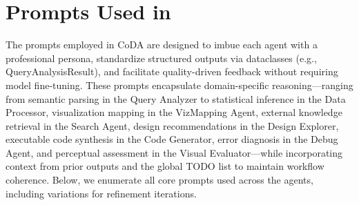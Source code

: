 \section{Prompts Used in \methodname{}}\label{appendix:prompts}

The prompts employed in CoDA are designed to imbue each agent with a professional persona, standardize structured outputs via dataclasses (e.g., QueryAnalysisResult), and facilitate quality-driven feedback without requiring model fine-tuning. These prompts encapsulate domain-specific reasoning—ranging from semantic parsing in the Query Analyzer to statistical inference in the Data Processor, visualization mapping in the VizMapping Agent, external knowledge retrieval in the Search Agent, design recommendations in the Design Explorer, executable code synthesis in the Code Generator, error diagnosis in the Debug Agent, and perceptual assessment in the Visual Evaluator—while incorporating context from prior outputs and the global TODO list to maintain workflow coherence. Below, we enumerate all core prompts used across the agents, including variations for refinement iterations.


